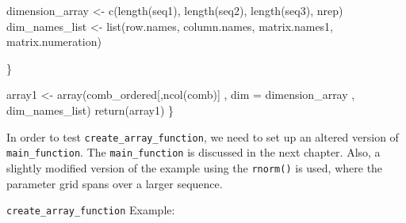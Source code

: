 \documentclass[11pt,a4paper]{article}
\newenvironment{Shaded}{\begin{snugshade}}{\end{snugshade}}
\newcommand{\AttributeTok}[1]{\textcolor[rgb]{0.77,0.63,0.00}{#1}}
\newcommand{\FunctionTok}[1]{\textcolor[rgb]{0.00,0.00,0.00}{#1}}
\newcommand{\NormalTok}[1]{#1}
\newcommand{\OtherTok}[1]{\textcolor[rgb]{0.56,0.35,0.01}{#1}}
\begin{document}
\begin{Shaded}
\begin{Highlighting}[]
\NormalTok{    dimension\_array }\OtherTok{\textless{}{-}} \FunctionTok{c}\NormalTok{(}\FunctionTok{length}\NormalTok{(seq1), }\FunctionTok{length}\NormalTok{(seq2), }\FunctionTok{length}\NormalTok{(seq3), nrep)}
\NormalTok{    dim\_names\_list }\OtherTok{\textless{}{-}} \FunctionTok{list}\NormalTok{(row.names, column.names, }
\NormalTok{                           matrix.names1, matrix.numeration)}
    
\NormalTok{  \}}
  
  
\NormalTok{  array1 }\OtherTok{\textless{}{-}} \FunctionTok{array}\NormalTok{(comb\_ordered[,}\FunctionTok{ncol}\NormalTok{(comb)] }
\NormalTok{                  , }\AttributeTok{dim =}\NormalTok{ dimension\_array}
\NormalTok{                  , dim\_names\_list)}
  \FunctionTok{return}\NormalTok{(array1)}
\NormalTok{\}}
\end{Highlighting}
\end{Shaded}

In order to test \texttt{create\_array\_function}, we need to set up an
altered version of \texttt{main\_function}. The \texttt{main\_function}
is discussed in the next chapter. Also, a slightly modified version of
the example using the \texttt{rnorm()} is used, where the parameter grid
spans over a larger sequence.

\texttt{create\_array\_function} Example:
\end{document}

